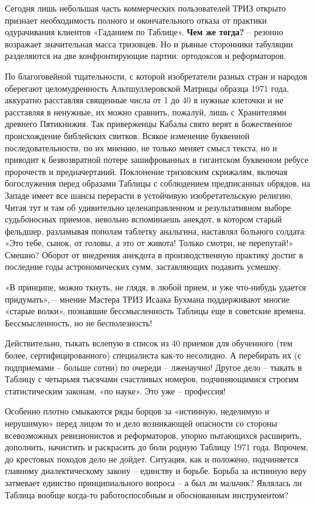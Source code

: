 \documentclass[11pt,a4paper]{article}
\begin{document}
Сегодня лишь небольшая часть коммерческих пользователей ТРИЗ открыто признает
необходимость полного и окончательного отказа от практики одурачивания
клиентов «Гаданием по Таблице». \textbf{Чем же тогда?} -- резонно возражает
значительная масса тризовцев. Но и рьяные сторонники табуляции разделяются на
две конфронтирующие партии: ортодоксов и реформаторов.

По благоговейной тщательности, с которой изобретатели разных стран и народов
оберегают целомудренность Альтшуллеровской Матрицы образца 1971 года,
аккуратно расставляя священные числа от 1 до 40 в нужные клеточки и не
расставляя в ненужные, их можно сравнить, пожалуй, лишь с Хранителями древнего
Пятикнижия. Так приверженцы Кабалы свято верят в божественное происхождение
библейских свитков. Всякое изменение буквенной последовательности, по их
мнению, не только меняет смысл текста, но и приводит к безвозвратной потере
зашифрованных в гигантском буквенном ребусе пророчеств и предначертаний.
Поклонение тризовским скрижалям, включая богослужения перед образами Таблицы с
соблюдением предписанных обрядов, на Западе имеет все шансы перерасти в
устойчивую изобретательскую религию. Читая тут и там об удивительно
целенаправленном и результативном выборе судьбоносных приемов, невольно
вспоминаешь анекдот, в котором старый фельдшер, разламывая пополам таблетку
анальгина, наставлял больного солдата: «Это тебе, сынок, от головы, а это от
живота! Только смотри, не перепутай!» Смешно? Оборот от внедрения анекдота в
производственную практику достиг в последние годы астрономических сумм,
заставляющих подавить усмешку.

«В принципе, можно ткнуть, не глядя, в любой прием, и уже что-нибудь удается
придумать», -- мнение Мастера ТРИЗ Исаака Бухмана поддерживают многие «старые
волки», познавшие бессмысленность Таблицы еще в советские времена.
Бессмысленность, но не бесполезность!

Действительно, тыкать вслепую в список из 40 приемов для обученного (тем
более, сертифицированного) специалиста как-то несолидно. А перебирать их (с
подприемами -- больше сотни) по очереди -- лженаучно! Другое дело -- тыкать в
Таблицу с четырьмя тысячами счастливых номеров, подчиняющимися строгим
статистическим законам, «по науке». Это уже -- профессия!

Особенно плотно смыкаются ряды борцов за «истинную, неделимую и нерушимую»
перед лицом то и дело возникающей опасности со стороны всевозможных
ревизионистов и реформаторов, упорно пытающихся расширить, дополнить,
начистить и раскрасить до боли родную Таблицу 1971 года. Впрочем, до крестовых
походов дело не дойдет. Ситуация, как и положено, подчиняется главному
диалектическому закону -- единству и борьбе. Борьба за истинную веру затмевает
единство принципиального вопроса -- а был ли мальчик? Являлась ли Таблица
вообще когда-то работоспособным и обоснованным инструментом?
\end{document}
